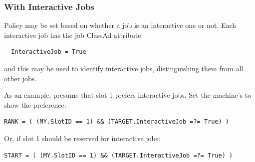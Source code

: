 

\subsubsection{\label{sec:Interactive-Job-Policy}With Interactive Jobs}

Policy may be set based on whether a job is an interactive one or not.
Each interactive job has the job ClassAd attribute
\begin{verbatim}
  InteractiveJob = True
\end{verbatim}
and this may be used to identify interactive jobs,
distinguishing them from all other jobs.

As an example, presume that slot 1 prefers interactive jobs.
Set the machine's  to show the preference:
\footnotesize
\begin{verbatim}
RANK = ( (MY.SlotID == 1) && (TARGET.InteractiveJob =?= True) )
\end{verbatim}
\normalsize

Or, if slot 1 should be reserved for interactive jobs:
\footnotesize
\begin{verbatim}
START = ( (MY.SlotID == 1) && (TARGET.InteractiveJob =?= True) )
\end{verbatim}
\normalsize
